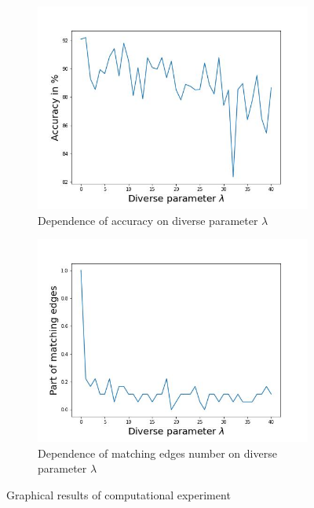 \documentclass{article}
\begin{document}
\begin{figure}[h]
	\centering
	\begin{subfigure}{.5\textwidth}
	  \centering
	  \includegraphics[width=1\linewidth]{fig2}
	  \caption{Dependence of accuracy on diverse parameter $\lambda$}
	  \label{fig:graph1}
	\end{subfigure}%
	\begin{subfigure}{.5\textwidth}
	  \centering
	  \includegraphics[width=1\linewidth]{fig3}
	  \caption{Dependence of matching edges number on diverse parameter $\lambda$}
	  \label{fig:graph2}
	\end{subfigure}
	\caption{Graphical results of computational experiment}
	\label{fig:graph}
\end{figure}
\end{document}
